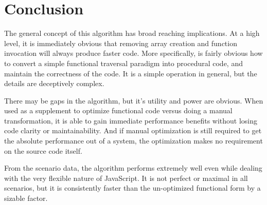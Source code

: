 \chapter{Conclusion}

The general concept of this algorithm has broad reaching implications.  At a high level, it is immediately obvious that removing array creation and function invocation will always produce faster code.  More specifically, is fairly obvious how to convert a simple functional traversal paradigm into procedural code, and maintain the correctness of the code. It is a simple operation in general, but the details are deceptively complex.

There may be gaps in the algorithm, but it's utility and power are obvious.  When used as a supplement to optimize functional code versus doing a manual transformation, it is able to gain immediate performance benefits without losing code clarity or maintainability.  And if manual optimization is still required to get the absolute performance out of a system, the optimization makes no requirement on the source code itself.    

From the scenario data, the algorithm performs extremely well even while dealing with the very flexible nature of JavaScript. It is not perfect or maximal in all scenarios, but it is consistently faster than the un-optimized functional form by a sizable factor.